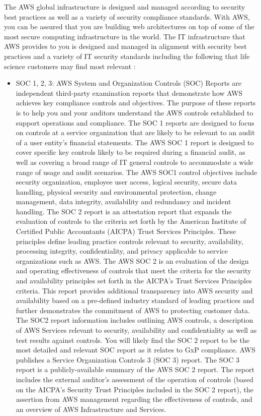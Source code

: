 The AWS global infrastructure is designed and managed according to security best practices as well as a variety of security compliance standards. With AWS, you can be assured that you are building web architectures on top of some of the most secure computing infrastructure in the world. The IT infrastructure that AWS provides to you is designed and managed in alignment with security best practices and a variety of IT security standards including the following that life science customers may find most relevant \cite{AWSCertificationsAndAttestations}: 
\begin{itemize}
    \item SOC 1, 2, 3:  AWS System and Organization Controls (SOC) Reports are independent third-party examination reports that demonstrate how AWS achieves key compliance controls and objectives. The purpose of these reports is to help you and your auditors understand the AWS controls established to support operations and compliance. The SOC 1 reports are designed to focus on controls at a service organization that are likely to be relevant to an audit of a user entity's financial statements. The AWS SOC 1 report is designed to cover specific key controls likely to be required during a financial audit, as well as covering a broad range of IT general controls to accommodate a wide range of usage and audit scenarios. The AWS SOC1 control objectives include security organization, employee user access, logical security, secure data handling, physical security and environmental protection, change management, data integrity, availability and redundancy and incident handling. The SOC 2 report is an attestation report that expands the evaluation of controls to the criteria set forth by the American Institute of Certified Public Accountants (AICPA) Trust Services Principles. These principles define leading practice controls relevant to security, availability, processing integrity, confidentiality, and privacy applicable to service organizations such as AWS. The AWS SOC 2 is an evaluation of the design and operating effectiveness of controls that meet the criteria for the security and availability principles set forth in the AICPA's Trust Services Principles criteria. This report provides additional transparency into AWS security and availability based on a pre-defined industry standard of leading practices and further demonstrates the commitment of AWS to protecting customer data. The SOC2 report information includes outlining AWS controls, a description of AWS Services relevant to security, availability and confidentiality as well as test results against controls. You will likely find the SOC 2 report to be the most detailed and relevant SOC report as it relates to GxP compliance. AWS publishes a Service Organization Controls 3 (SOC 3) report. The SOC 3 report is a publicly-available summary of the AWS SOC 2 report. The report includes the external auditor's assessment of the operation of controls (based on the AICPA's Security Trust Principles included in the SOC 2 report), the assertion from AWS management regarding the effectiveness of controls, and an overview of AWS Infrastructure and Services. 

\end{itemize}
